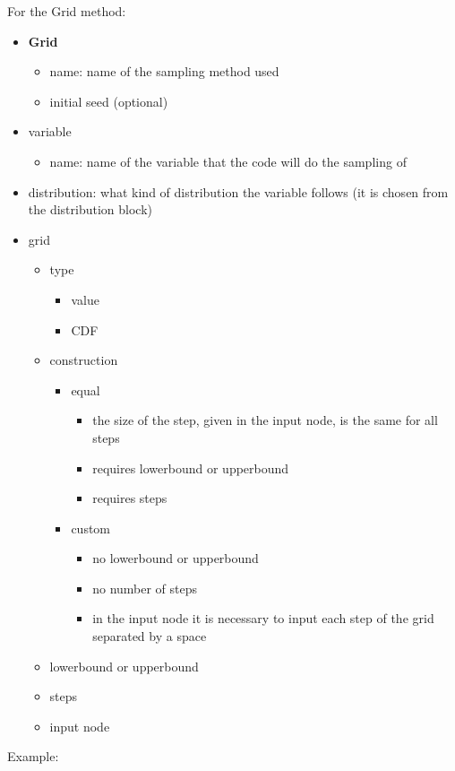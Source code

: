 For the Grid method:
\begin{itemize}
\item \textbf{Grid}
\begin{itemize}
\item name: name of the sampling method used
\item initial seed (optional)
\end{itemize}
\item variable
\begin{itemize}
\item name: name of the variable that the code will do the sampling of
\end{itemize}
\item distribution: what kind of distribution the variable follows (it is chosen from the distribution block) 
\item grid
\begin{itemize}
\item type
\begin{itemize}
\item value
\item CDF
\end{itemize}
\item construction 
\begin{itemize}
\item equal
\begin{itemize}
\item the size of the step, given in the input node, is the same for all steps
\item requires lowerbound or upperbound
\item requires steps
\end{itemize}
\item custom
\begin{itemize} 
\item no lowerbound or upperbound 
\item no number of steps
\item in the input node it is necessary to input each step of the grid separated by a space
\end{itemize}
\end{itemize}
\item lowerbound or upperbound
\item steps
\item input node
\end{itemize}
\end{itemize}

Example: 

